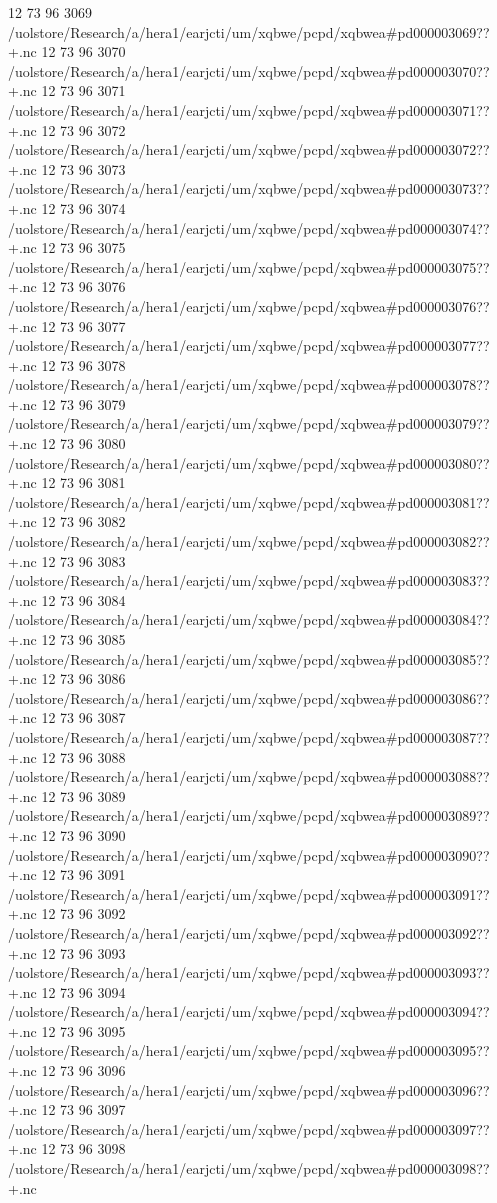 12 73 96
3069
/uolstore/Research/a/hera1/earjcti/um/xqbwe/pcpd/xqbwea#pd000003069??+.nc
12 73 96
3070
/uolstore/Research/a/hera1/earjcti/um/xqbwe/pcpd/xqbwea#pd000003070??+.nc
12 73 96
3071
/uolstore/Research/a/hera1/earjcti/um/xqbwe/pcpd/xqbwea#pd000003071??+.nc
12 73 96
3072
/uolstore/Research/a/hera1/earjcti/um/xqbwe/pcpd/xqbwea#pd000003072??+.nc
12 73 96
3073
/uolstore/Research/a/hera1/earjcti/um/xqbwe/pcpd/xqbwea#pd000003073??+.nc
12 73 96
3074
/uolstore/Research/a/hera1/earjcti/um/xqbwe/pcpd/xqbwea#pd000003074??+.nc
12 73 96
3075
/uolstore/Research/a/hera1/earjcti/um/xqbwe/pcpd/xqbwea#pd000003075??+.nc
12 73 96
3076
/uolstore/Research/a/hera1/earjcti/um/xqbwe/pcpd/xqbwea#pd000003076??+.nc
12 73 96
3077
/uolstore/Research/a/hera1/earjcti/um/xqbwe/pcpd/xqbwea#pd000003077??+.nc
12 73 96
3078
/uolstore/Research/a/hera1/earjcti/um/xqbwe/pcpd/xqbwea#pd000003078??+.nc
12 73 96
3079
/uolstore/Research/a/hera1/earjcti/um/xqbwe/pcpd/xqbwea#pd000003079??+.nc
12 73 96
3080
/uolstore/Research/a/hera1/earjcti/um/xqbwe/pcpd/xqbwea#pd000003080??+.nc
12 73 96
3081
/uolstore/Research/a/hera1/earjcti/um/xqbwe/pcpd/xqbwea#pd000003081??+.nc
12 73 96
3082
/uolstore/Research/a/hera1/earjcti/um/xqbwe/pcpd/xqbwea#pd000003082??+.nc
12 73 96
3083
/uolstore/Research/a/hera1/earjcti/um/xqbwe/pcpd/xqbwea#pd000003083??+.nc
12 73 96
3084
/uolstore/Research/a/hera1/earjcti/um/xqbwe/pcpd/xqbwea#pd000003084??+.nc
12 73 96
3085
/uolstore/Research/a/hera1/earjcti/um/xqbwe/pcpd/xqbwea#pd000003085??+.nc
12 73 96
3086
/uolstore/Research/a/hera1/earjcti/um/xqbwe/pcpd/xqbwea#pd000003086??+.nc
12 73 96
3087
/uolstore/Research/a/hera1/earjcti/um/xqbwe/pcpd/xqbwea#pd000003087??+.nc
12 73 96
3088
/uolstore/Research/a/hera1/earjcti/um/xqbwe/pcpd/xqbwea#pd000003088??+.nc
12 73 96
3089
/uolstore/Research/a/hera1/earjcti/um/xqbwe/pcpd/xqbwea#pd000003089??+.nc
12 73 96
3090
/uolstore/Research/a/hera1/earjcti/um/xqbwe/pcpd/xqbwea#pd000003090??+.nc
12 73 96
3091
/uolstore/Research/a/hera1/earjcti/um/xqbwe/pcpd/xqbwea#pd000003091??+.nc
12 73 96
3092
/uolstore/Research/a/hera1/earjcti/um/xqbwe/pcpd/xqbwea#pd000003092??+.nc
12 73 96
3093
/uolstore/Research/a/hera1/earjcti/um/xqbwe/pcpd/xqbwea#pd000003093??+.nc
12 73 96
3094
/uolstore/Research/a/hera1/earjcti/um/xqbwe/pcpd/xqbwea#pd000003094??+.nc
12 73 96
3095
/uolstore/Research/a/hera1/earjcti/um/xqbwe/pcpd/xqbwea#pd000003095??+.nc
12 73 96
3096
/uolstore/Research/a/hera1/earjcti/um/xqbwe/pcpd/xqbwea#pd000003096??+.nc
12 73 96
3097
/uolstore/Research/a/hera1/earjcti/um/xqbwe/pcpd/xqbwea#pd000003097??+.nc
12 73 96
3098
/uolstore/Research/a/hera1/earjcti/um/xqbwe/pcpd/xqbwea#pd000003098??+.nc
